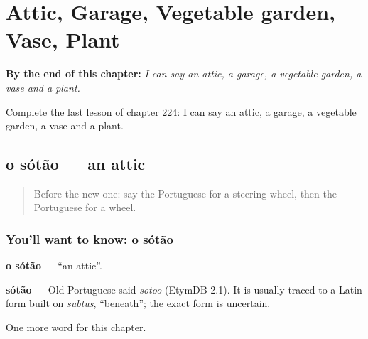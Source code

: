 
\chapter{Attic, Garage, Vegetable garden, Vase, Plant}
\label{ch:pt-attic-garage-vegetable-garden-vase-plant}

\begin{chapteropening}
\textbf{By the end of this chapter:} \emph{I can say an attic, a garage, a vegetable garden, a vase and a plant.}

Complete the last lesson of chapter 224: I can say an attic, a garage, a vegetable garden, a vase and a plant.
\end{chapteropening}

\section[o sótão]{o sótão — an attic}

\label{lesson:PT-C224-sotao}



\begin{quote}
Before the new one: say the Portuguese for a steering wheel, then the Portuguese for a wheel.
\end{quote}

\subsection*{You'll want to know: o sótão}
\textbf{o sótão} — \textquotedblleft{}an attic\textquotedblright{}.

\begin{cousinweb}
\textbf{sótão} — Old Portuguese said \emph{sotoo} (EtymDB 2.1). It is usually traced to a Latin form built on \emph{subtus}, \textquotedblleft{}beneath\textquotedblright{}; the exact form is uncertain.
\end{cousinweb}

\begin{grammarlens}[title={What you've built}]
One more word for this chapter.
\end{grammarlens}

